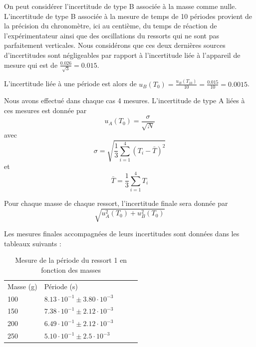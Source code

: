 \documentclass[a4paper,10pt,french]{scrartcl}
\begin{document}
On peut considérer l'incertitude de type B associée à la masse comme nulle. L'incertitude de type B associée à la mesure de temps de 10 périodes provient de la précision du chronomètre, ici au centième, du temps de réaction de l'expérimentateur ainsi que des oscillations du ressorts qui ne sont pas parfaitement verticales. Nous considérons que ces deux dernières sources d'incertitudes sont négligeables par rapport à l'incertitude liée à l'appareil de mesure qui est de \(\frac{0.026}{\sqrt{3}} = 0.015\).

L'incertitude liée à une période est alors de \(u_B(T_0) = \frac{u_B(T_{10})}{10} = \frac{0.015}{10} = 0.0015\).

Nous avons effectué dans chaque cas 4 mesures. L'incertitude de type A liées à ces mesures est donnée par \[u_A(T_0) = \frac{\sigma}{\sqrt{N}}\] avec \[\sigma = \sqrt{\frac{1}{3}\sum^{4}_{i=1}(T_i-\bar{T})^2}\] et \[\bar{T} = \frac{1}{3}\sum^4_{i=1} T_i\]

Pour chaque masse de chaque ressort, l'incertitude finale sera donnée par \[\sqrt{u^2_A(T_0)+u^2_B(T_0)}\]

Les mesures finales accompagnées de leurs incertitudes sont données dans les tableaux suivants :
%
%

\begin{table}[H]
\begin{center}
\begin{tabular}{lllll}
Masse (g) & Période (s)\\
100 & \(8.13\cdot 10^{-1}\pm 3.80\cdot 10^{-3}\)\\
150& \(7.38\cdot 10^{-1}\pm 2.12\cdot 10^{-3}\)\\
200& \(6.49\cdot 10^{-1}\pm 2.12\cdot 10^{-3}\)\\
250& \(5.10\cdot 10^{-1}\pm2.5\cdot 10^{-3}\)\\

\end{tabular}

\end{center}
\caption{Mesure de la période du ressort 1 en fonction des masses}
\end{table}
\end{document}
